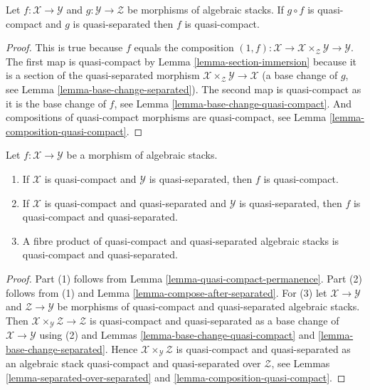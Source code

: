 \begin{lemma}
\label{lemma-quasi-compact-permanence}
Let $f : \mathcal{X} \to \mathcal{Y}$ and
$g : \mathcal{Y} \to \mathcal{Z}$ be morphisms of algebraic stacks.
If $g \circ f$ is quasi-compact and $g$ is quasi-separated
then $f$ is quasi-compact.
\end{lemma}

\begin{proof}
This is true because $f$ equals the composition
$(1, f) : \mathcal{X} \to \mathcal{X} \times_\mathcal{Z} \mathcal{Y} \to
\mathcal{Y}$.
The first map is quasi-compact by
Lemma \ref{lemma-section-immersion}
because it is a section of the quasi-separated morphism
$\mathcal{X} \times_\mathcal{Z} \mathcal{Y} \to \mathcal{X}$
(a base change of $g$, see
Lemma \ref{lemma-base-change-separated}).
The second map is quasi-compact as it is the base change of $f$, see
Lemma \ref{lemma-base-change-quasi-compact}.
And compositions of quasi-compact
morphisms are quasi-compact, see Lemma \ref{lemma-composition-quasi-compact}.
\end{proof}

\begin{lemma}
\label{lemma-quasi-compact-quasi-separated-permanence}
Let $f : \mathcal{X} \to \mathcal{Y}$ be a morphism of algebraic stacks.
\begin{enumerate}
\item If $\mathcal{X}$ is quasi-compact and $\mathcal{Y}$ is
quasi-separated, then $f$ is quasi-compact.
\item If $\mathcal{X}$ is quasi-compact and quasi-separated and $\mathcal{Y}$
is quasi-separated, then $f$ is quasi-compact and quasi-separated.
\item A fibre product of quasi-compact and quasi-separated algebraic stacks
is quasi-compact and quasi-separated.
\end{enumerate}
\end{lemma}

\begin{proof}
Part (1) follows from
Lemma \ref{lemma-quasi-compact-permanence}.
Part (2) follows from (1) and
Lemma \ref{lemma-compose-after-separated}.
For (3) let $\mathcal{X} \to \mathcal{Y}$ and $\mathcal{Z} \to \mathcal{Y}$
be morphisms of quasi-compact and quasi-separated algebraic stacks.
Then $\mathcal{X} \times_\mathcal{Y} \mathcal{Z} \to \mathcal{Z}$
is quasi-compact and quasi-separated as a base change of
$\mathcal{X} \to \mathcal{Y}$ using (2) and
Lemmas \ref{lemma-base-change-quasi-compact} and
\ref{lemma-base-change-separated}.
Hence $\mathcal{X} \times_\mathcal{Y} \mathcal{Z}$
is quasi-compact and quasi-separated as
an algebraic stack quasi-compact and quasi-separated over
$\mathcal{Z}$, see
Lemmas \ref{lemma-separated-over-separated} and
\ref{lemma-composition-quasi-compact}.
\end{proof}








